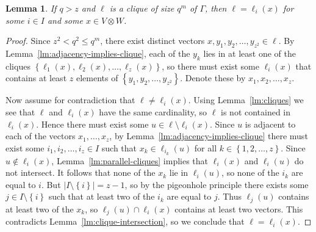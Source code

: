 \documentclass[10pt]{amsart}
\theoremstyle{definition}
\theoremstyle{plain}
\newtheorem{lemma}[lemma]{Lemma}
\theoremstyle{plain}
\theoremstyle{plain}
\theoremstyle{plain}
\begin{document}
\begin{lemma} \label{lm:no-other-cliques}
If $q > z$ and $\ell$ is a clique of size $q^m$ of $\Gamma$, then $\ell = \ell_i{\left(x \right)}$ for some $i \in I$ and some $x \in V \otimes W$.
\end{lemma}
\begin{proof}
Since $z^2 < q^2 \leqslant q^m$, there exist distinct vectors $x, y_1, y_2, \ldots, y_{z^2} \in \ell$. By Lemma~\ref{lm:adjacency-implies-clique}, each of the $y_k$ lies in at least one of the cliques $\left\{\ell_1{\left(x \right)}, \ell_2{\left(x \right)}, \ldots, \ell_z{\left(x \right)}\right\}$, so there must exist some $\ell_i{\left(x \right)}$ that contains at least $z$ elements of $\left\{y_1, y_2, \ldots, y_{z^2} \right\}$. Denote these by $x_1, x_2, \ldots, x_z$.

Now assume for contradiction that $\ell \neq \ell_i{\left(x \right)}$. Using Lemma~\ref{lm:cliques} we see that $\ell$ and $\ell_i{\left(x \right)}$ have the same cardinality, so $\ell$ is not contained in $\ell_i{\left(x \right)}$. Hence there must exist some $u \in \ell \setminus \ell_i{\left(x \right)}$. Since $u$ is adjacent to each of the vectors $x_1, \ldots, x_z$, by Lemma~\ref{lm:adjacency-implies-clique} there must exist some $i_1, i_2, \ldots, i_z \in I$ such that $x_k \in \ell_{i_k}{\left(u \right)}$ for all $k \in \left\{1, 2, \ldots, z \right\}$. Since $u \notin \ell_i{\left(x \right)}$, Lemma~\ref{lm:parallel-cliques} implies that $\ell_i{\left(x \right)}$ and $\ell_i{\left(u \right)}$ do not intersect. It follows that none of the $x_k$ lie in $\ell_i{\left(u \right)}$, so none of the $i_k$ are equal to $i$. But $\left|I \setminus \left\{i \right\}\right| = z-1$, so by the pigeonhole principle there exists some $j \in I \setminus \left\{i \right\}$ such that at least two of the $i_k$ are equal to $j$. Thus $\ell_j{\left(u \right)}$ contains at least two of the $x_k$, so $\ell_j{\left(u \right)} \cap \ell_i{\left(x \right)}$ contains at least two vectors. This contradicts Lemma~\ref{lm:clique-intersection}, so we conclude that $\ell = \ell_i{\left(x \right)}$.
\end{proof}
\end{document}
